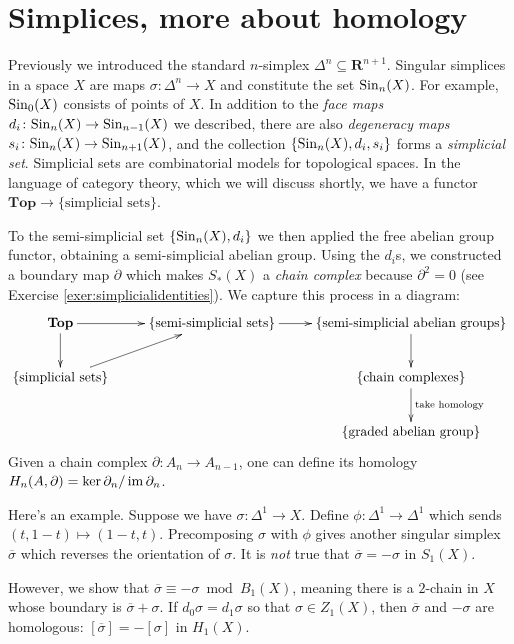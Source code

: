
\section{Simplices, more about homology}
Previously we introduced the standard $n$-simplex $\Delta^n\subseteq\mathbf{R}^{n+1}$. Singular simplices in a space $X$ are maps $\sigma\colon\Delta^n\to X$ and constitute the set $\mathrm{Sin}_n(X)$. For example, $\mathrm{Sin}_0(X)$ consists of points of $X$. In addition to the \emph{face maps} $d_i\colon\mathrm{Sin}_n(X)\to\mathrm{Sin}_{n-1}(X)$ we described, there are also \emph{degeneracy maps} $s_i\colon\mathrm{Sin}_n(X)\to\mathrm{Sin}_{n+1}(X)$, and the collection $\{\mathrm{Sin}_n(X),d_i,s_i\}$ forms a \emph{simplicial set}. Simplicial sets are combinatorial models for topological spaces. In the language of category theory, which we will discuss shortly, we have a functor $\mathbf{Top}\to\{\text{simplicial sets}\}$.

To the semi-simplicial set $\{\mathrm{Sin}_n(X),d_i\}$ we then applied the free abelian group functor, obtaining a semi-simplicial abelian group. Using the $d_i$s, we constructed a boundary map $\partial$ which makes $S_\ast(X)$ a \emph{chain complex} because $\partial^2=0$ (see Exercise \ref{exer:simplicialidentities}). We capture this process in a diagram:
\begin{equation*}
\xymatrix{\mathbf{Top}\ar[d]\ar[r] & \{\text{semi-simplicial sets}\}\ar[r] & \{\text{semi-simplicial abelian groups}\}\ar[d]\\
    \{\text{simplicial sets}\}\ar[ur] & & \{\text{chain complexes}\}\ar[d]^{\text{take homology}}\\
 & &\{\text{graded abelian group}\}}
\end{equation*}
Given a chain complex $\partial\colon A_n\to A_{n-1}$, one can define its homology $H_n(A,\partial)=\ker\partial_n/\operatorname{im}\partial_n$.

Here's an example. Suppose we have $\sigma\colon \Delta^1\to X$. Define $\phi\colon\Delta^1\to\Delta^1$ which sends $(t,1-t)\mapsto (1-t,t)$. Precomposing $\sigma$ with $\phi$ gives another singular simplex $\overline{\sigma}$ which reverses the orientation of $\sigma$. It is \textit{not} true that $\overline{\sigma}=-\sigma$ in $S_1(X)$.

However, we show that $\overline{\sigma}\equiv -\sigma\bmod B_1(X)$, meaning there is a $2$-chain in $X$ whose boundary is $\overline{\sigma}+\sigma$. If $d_0\sigma=d_1\sigma$ so that $\sigma\in Z_1(X)$, then $\overline{\sigma}$ and $-\sigma$ are homologous: $[\overline{\sigma}]=-[\sigma]$ in $ H_1(X)$.


